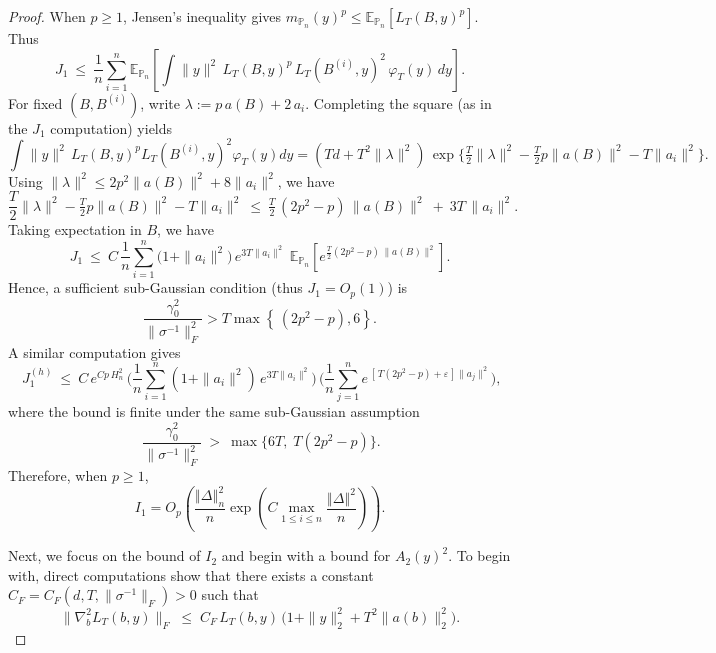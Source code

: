 \documentclass[11pt]{article}
\theoremstyle{definition}
\newcommand{\E}{\mathbb{E}}
\begin{document}
\begin{proof}
When $p \geq 1$, Jensen's inequality gives \(m_{\mathbb{P}_n}(y)^p \le \E_{\mathbb{P}_n}[L_T(B,y)^{p}]\). Thus
\[
J_1\ \le\ \frac1n\sum_{i=1}^n \E_{\mathbb{P}_n}\!\left[\int \|y\|^2\,L_T(B,y)^{p}\,L_T(B^{(i)},y)^{2}\,\varphi_T(y)\,dy\right].
\]
For fixed $(B,B^{(i)})$, write $\lambda:=p\,a(B)+2\,a_i$.
Completing the square (as in the $J_1$ computation) yields
\[
\int \|y\|^2\,L_T(B,y)^{p}L_T(B^{(i)},y)^{2}\varphi_T(y)dy
= (Td+T^2\|\lambda\|^2)\,\exp\!\Big\{\tfrac{T}{2}\|\lambda\|^2-\tfrac{T}{2}p\|a(B)\|^2-T\|a_i\|^2\Big\}.
\]
Using $\|\lambda\|^2\le 2p^2\|a(B)\|^2+8\|a_i\|^2$, we have 
\[
\frac{T}{2}\|\lambda\|^2-\tfrac{T}{2}p\|a(B)\|^2-T\|a_i\|^2
\ \le\ \tfrac{T}{2}\,(2p^2-p)\,\|a(B)\|^2\ +\ 3T\,\|a_i\|^2.
\]
Taking expectation in $B$, we have
\[
J_1\ \le\ C\,\frac1n\sum_{i=1}^n \big(1+\|a_i\|^2\big)\,e^{3T\|a_i\|^2}\;
\E_{\mathbb{P}_n}\!\left[e^{\frac{T}{2}(2p^2-p)\,\|a(B)\|^2}\right].
\]
Hence, a sufficient sub-Gaussian condition (thus $J_1=O_p(1)$) is
$$\frac{\gamma_0^2}{\|\sigma^{-1}\|_F^2} > T\max\left\{\,(2p^2-p),6\right\}.$$
A similar computation gives
\[
\quad
J_1^{(h)}\ \le\ C\,e^{C p\,H_n^2}\,
\Big(\frac1n\sum_{i=1}^n (1+\|a_i\|^2)\,e^{3T\|a_i\|^2}\Big)\,
\Big(\frac1n\sum_{j=1}^n e^{\,[\,T(2p^2-p)+\varepsilon\,]\|a_j\|^2}\Big),
\quad
\]where the bound is finite under 
the same sub-Gaussian assumption
\[
\ \frac{\gamma_0^2}{\|\sigma^{-1}\|_F^2}\ >\ \max\!\big\{6T,\;T(2p^2-p)\big\}.
\]
Therefore, when $p \geq 1$,
$$I_1 = O_p\left(\frac{\left\Vert \Delta\right\Vert^2_n}{n}\exp\left(C\max_{1\leq i \leq n}\frac{\left\Vert \Delta\right\Vert^2}{n}\right)\right).$$

Next, we focus on the bound of $I_2$ and begin with a bound for $A_2(y)^2$.
To begin with, direct computations show that there exists a constant $C_F=C_F(d,T,\|\sigma^{-1}\|_F) > 0$ such that
$$\big\|\nabla_b^2 L_T(b,y)\big\|_F
\;\le\; C_F\,L_T(b,y)\,\Big(1+\|y\|_2^2+T^2\|a(b)\|_2^2\Big). $$


\end{proof}
\end{document}
